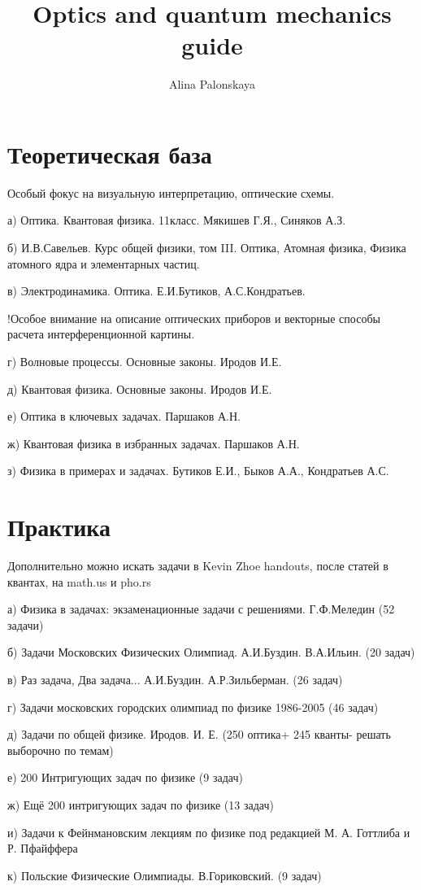 \documentclass{article}
\title{Optics and quantum mechanics guide}
\author{Alina Palonskaya}
\date{}
\begin{document}
\maketitle
\Large\section{Теоретическая база}
\large{
Особый фокус на визуальную интерпретацию, оптические схемы.

а) Оптика. Квантовая физика. 11класс. Мякишев Г.Я., Синяков А.З.

б) И.В.Савельев. Курс общей физики, том III. Оптика, Атомная физика, Физика атомного ядра и элементарных частиц.

в) Электродинамика. Оптика. Е.И.Бутиков, А.С.Кондратьев.

!Особое внимание на описание оптических приборов и векторные способы расчета интерференционной картины.

г) Волновые процессы. Основные законы. Иродов И.Е.

д) Квантовая физика. Основные законы. Иродов И.Е.

е) Оптика в ключевых задачах. Паршаков А.Н.

ж) Квантовая физика в избранных задачах. Паршаков А.Н.

з) Физика в примерах и задачах. Бутиков Е.И., Быков А.А., Кондратьев А.С.
}
\Large\section{Практика}
\large{
Дополнительно можно искать задачи в Kevin Zhoe handouts, после статей в квантах, на math.us и pho.rs

а) Физика в задачах: экзаменационные задачи с решениями. Г.Ф.Меледин (52 задачи)

б) Задачи Московских Физических Олимпиад. А.И.Буздин. В.А.Ильин. (20 задач)

в) Раз задача, Два задача... А.И.Буздин. А.Р.Зильберман. (26 задач)

г) Задачи московских городских олимпиад по физике 1986-2005 (46 задач)

д) Задачи по общей физике. Иродов. И. Е. (250 оптика+ 245 кванты- решать выборочно по темам)

е) 200 Интригующих задач по физике (9 задач)

ж) Ещё 200 интригующих задач по физике (13 задач)

и) Задачи к Фейнмановским лекциям по физике под редакцией М. А. Готтлиба и Р. Пфайффера

к) Польские Физические Олимпиады. В.Гориковский. (9 задач)
}
\end{document}
